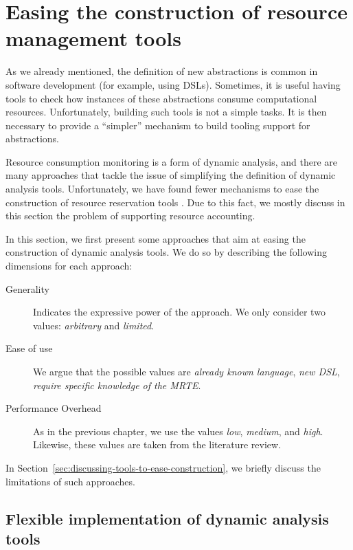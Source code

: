 \section{Easing the construction of resource management tools} \label{sec:easy-tools-contruction}

As we already mentioned, the definition of new abstractions is common in software development (for example, using DSLs).
Sometimes, it is useful having tools to check how instances of these abstractions consume computational resources.
Unfortunately, building such tools is not a simple tasks.
It is then necessary to provide a ``simpler'' mechanism to build tooling support for abstractions.

Resource consumption monitoring is a form of dynamic analysis, and there are many approaches that tackle the issue of simplifying the definition of dynamic analysis tools.
Unfortunately, we have found fewer mechanisms to ease the construction of resource reservation tools \cite{mueller}.
Due to this fact, we mostly discuss in this section the problem of supporting resource accounting. 

In this section, we first present some approaches that aim at easing the construction of dynamic analysis tools.
We do so by describing the following dimensions for each approach:

\begin{description}
\item[Generality] Indicates the expressive power of the approach. We only consider two values: \textit{arbitrary} and \textit{limited}.

\item[Ease of use] We argue that the possible values are \textit{already known language}, \textit{new DSL}, \textit{require specific knowledge of the MRTE}.

\item[Performance Overhead] As in the previous chapter, we use the values \textit{low}, \textit{medium}, and \textit{high}.
Likewise, these values are taken from the literature review.
\end{description}

In Section~\ref{sec:discussing-tools-to-ease-construction}, we briefly discuss the limitations of such approaches.


\subsection{Flexible implementation of dynamic analysis tools}

